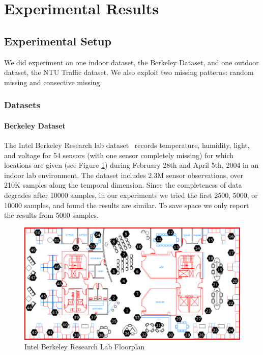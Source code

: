 \section{Experimental Results}  \label{sec:exp}

\subsection{Experimental Setup}
We did experiment on one indoor dataset, the Berkeley Dataset, and one outdoor dataset, the NTU Traffic dataset. We also exploit two missing patterns: random missing and consective missing.
\subsubsection{Datasets}

\paragraph*{Berkeley Dataset}

The Intel Berkeley Research lab dataset~\cite{berkeley2004lab} records temperature, humidity, light, and voltage for 54 sensors (with one sensor completely missing) for which locations are given (see Figure \ref{berkeley_lab}) during February 28th and April 5th, 2004 in an indoor lab environment.
The dataset includes 2.3M sensor observations, over 210K samples along the temporal dimension. Since the completeness of data degrades after 10000 samples, in our experiments we tried the first 2500, 5000, or 10000 samples, and found the results are similar. To save space we only report the results from 5000 samples. 

\begin{figure}[H]
\centering
\includegraphics[scale=0.25]{berkeley_lab.png}
\caption{Intel Berkeley Research Lab Floorplan} \label{berkeley_lab}
\end{figure}

